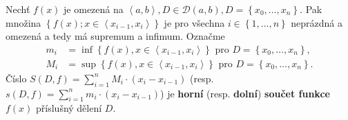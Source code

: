 \begin{definition}
Nechť $f(x)$ je omezená na $\left<  a,b \right> , D\in \mathscr D(a,b),
D=\left \{ x_0,\dots,x_n \right \}. $ Pak množina $\left \{ f(x);
x \in \left<  x_{i-1},x_i \right>  \right \} $ je pro všechna $i \in \left \{
1,\dots,n\right \} $ neprázdná a omezená a tedy má supremum a infimum.
Označme
\begin{align*}
    m_i &= \inf \left \{ f(x), x \in \left<  x_{i-1},x_i \right>  \right \} \textrm{ pro } D=\left \{ x_0,\dots,x_n \right \},\\
    M_i &=   \sup \left \{ f(x), x \in \left<  x_{i-1},x_i \right>  \right \} \textrm{ pro } D=\left \{ x_0,\dots,x_n \right \}.
\end{align*}
Číslo $S(D,f)=\sum_{i=1}^n M_i\cdot (x_i-x_{i-1})$
(resp. $s(D,f)=\sum_{i=1}^n m_i\cdot (x_i-x_{i-1})$) je \textbf{horní} (resp. \textbf{dolní}) \textbf{součet funkce}
$f(x)$ příslušný dělení $D$.
\end{definition}

